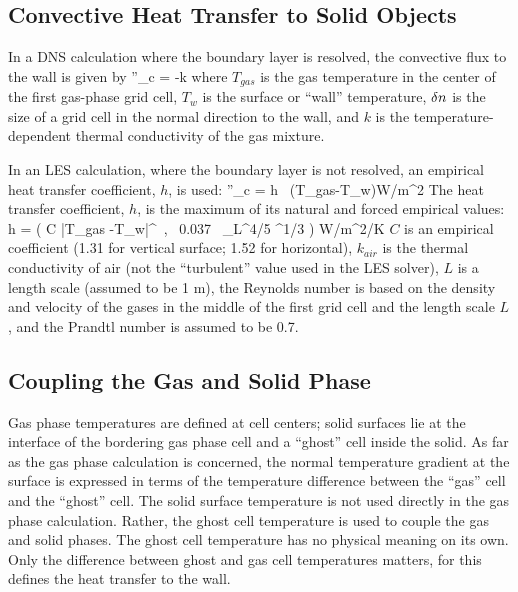 \documentclass[11pt]{book}
\begin{document}
\subsection{Convective Heat Transfer to Solid Objects}

In a DNS calculation where the boundary layer is resolved, the convective flux to the wall
is given by
\be
\dq''_c = -k 
\ee
where $T_{gas}$ is the gas temperature in the center of the first gas-phase grid cell,
$T_w$ is the surface or ``wall'' temperature, $\delta n$ is the
size of a grid cell in the normal direction to the wall, and $k$ is
the temperature-dependent thermal conductivity of the gas mixture.

In an LES calculation, where the boundary layer is not resolved, an empirical heat transfer coefficient, $h$, is used: \be \dq''_c = h \,
(T_{gas}-T_w)\quad \hbox{W/m}^2 \ee The heat transfer coefficient, $h$, is the maximum of its natural and forced empirical values:
 \be h = \max \left( C |T_{gas} -T_w|^\ot \, , \,  0.037 \, \RE_L^{4/5} \PR^{1/3} \right)  \quad \hbox{W/m}^2\hbox{/K}  \ee
$C$ is an empirical coefficient (1.31 for vertical surface; 1.52 for horizontal), $k_{air}$ is
the thermal conductivity of air (not the ``turbulent''
value used in the LES solver), $L$ is a length scale (assumed to be 1 m), the Reynolds number
is based on the density and velocity of the gases in
the middle of the first grid cell and the length scale $L$, and the Prandtl number is assumed to be 0.7.


\subsection{Coupling the Gas and Solid Phase}

Gas phase temperatures are defined at cell centers; solid surfaces lie at the
interface of the bordering gas phase cell and a ``ghost'' cell inside the
solid. As far as the gas phase calculation is concerned,
the normal temperature gradient at the surface is expressed in terms of
the temperature difference between the ``gas'' cell and the ``ghost'' cell.
The solid surface temperature is not used directly in the gas phase calculation.
Rather, the ghost cell temperature is used to couple the gas and solid phases.
The ghost cell temperature
has no physical meaning on its own. Only the difference between ghost and
gas cell temperatures matters, for this defines the heat transfer to the
wall.
\end{document}

